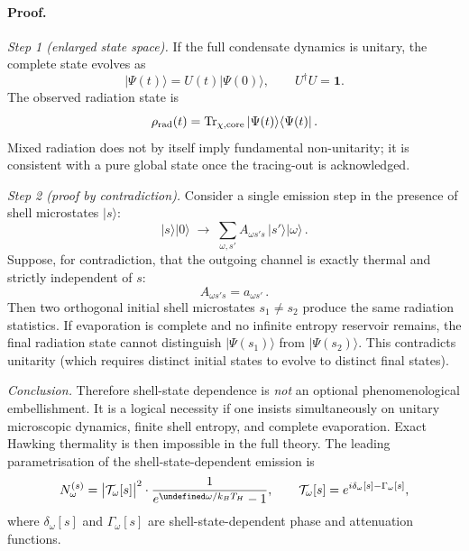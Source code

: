 \documentclass[11pt,a4paper]{article}
\let\hbar\undefined
\numberwithin{equation}{section}
\begin{document}
\paragraph{Proof.}

\textit{Step 1 (enlarged state space).}
If the full condensate dynamics is unitary, the complete state evolves as
\begin{equation}
|\Psi(t)\rangle = U(t)|\Psi(0)\rangle, \qquad U^\dagger U = \mathbf{1}.
\end{equation}
The observed radiation state is
\begin{equation}
\rho_{\rm rad}(t) = \mathrm{Tr}_{\chi,\rm core}\,|\Psi(t)\rangle\langle\Psi(t)|\,.
\end{equation}
Mixed radiation does not by itself imply fundamental non-unitarity; it is
consistent with a pure global state once the tracing-out is acknowledged.

\textit{Step 2 (proof by contradiction).}
Consider a single emission step in the presence of shell microstates $|s\rangle$:
\begin{equation}
|s\rangle|0\rangle
\;\longrightarrow\;
\sum_{\omega,s'} A_{\omega s' s}\,|s'\rangle|\omega\rangle\,.
\label{eq:emission_step}
\end{equation}
Suppose, for contradiction, that the outgoing channel is exactly thermal and
strictly independent of $s$:
\begin{equation}
A_{\omega s' s} = a_{\omega s'}\,.
\end{equation}
Then two orthogonal initial shell microstates $s_1\neq s_2$ produce the same
radiation statistics.
If evaporation is complete and no infinite entropy reservoir remains,
the final radiation state cannot distinguish $|\Psi(s_1)\rangle$ from
$|\Psi(s_2)\rangle$.
This contradicts unitarity (which requires distinct initial states to evolve to
distinct final states).

\textit{Conclusion.}
Therefore shell-state dependence is \emph{not} an optional phenomenological
embellishment.
It is a logical necessity if one insists simultaneously on unitary microscopic
dynamics, finite shell entropy, and complete evaporation.
Exact Hawking thermality is then impossible in the full theory.
The leading parametrisation of the shell-state-dependent emission is
\begin{equation}
  \label{eq:Nomega_corrected}
  N_\omega^{(s)}
  = \bigl|\mathcal{T}_\omega[s]\bigr|^2
  \cdot\frac{1}{e^{\hbar\omega/k_BT_H}-1},
  \qquad
  \mathcal{T}_\omega[s]=e^{i\delta_\omega[s]-\Gamma_\omega[s]},
\end{equation}
where $\delta_\omega[s]$ and $\Gamma_\omega[s]$ are shell-state-dependent
phase and attenuation functions.
\end{document}
